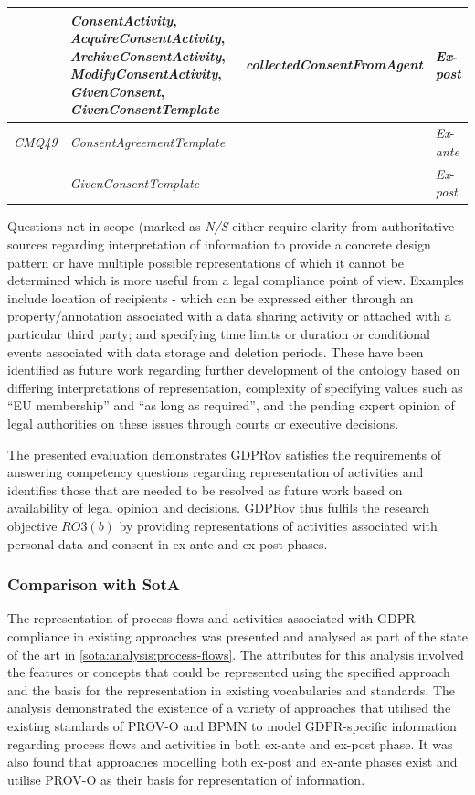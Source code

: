 \begin{table}[htbp]
\begin{tabularx}{\linewidth}{|l|X|p{5cm}|l|}
 & \textit{ConsentActivity}, \textit{AcquireConsentActivity}, \textit{ArchiveConsentActivity}, \textit{ModifyConsentActivity}, \textit{GivenConsent}, \textit{GivenConsentTemplate} & \textit{collectedConsentFromAgent} & \textit{Ex}-\textit{post} \\ \hline
\textit{CMQ49} & \textit{ConsentAgreementTemplate} &  & \textit{Ex}-\textit{ante} \\ \hline
 & \textit{GivenConsentTemplate} &  & \textit{Ex}-\textit{post} \\ \hline
\end{tabularx}
\end{table}

Questions not in scope (marked as \textit{N/S} either require clarity from authoritative sources regarding interpretation of information to provide a concrete design pattern or have multiple possible representations of which it cannot be determined which is more useful from a legal compliance point of view. Examples include location of recipients - which can be expressed either through an property/annotation associated with a data sharing activity or attached with a particular third party; and specifying time limits or duration or conditional events associated with data storage and deletion periods. These have been identified as future work regarding further development of the ontology based on differing interpretations of representation, complexity of specifying values such as ``EU membership'' and  ``as long as required'', and the pending expert opinion of legal authorities on these issues through courts or executive decisions.

The presented evaluation demonstrates GDPRov satisfies the requirements of answering competency questions regarding representation of activities and identifies those that are needed to be resolved as future work based on availability of legal opinion and decisions. GDPRov thus fulfils the research objective $RO3(b)$ by providing representations of activities associated with personal data and consent in ex-ante and ex-post phases.

\subsubsection{Comparison with SotA}
The representation of process flows and activities associated with GDPR compliance in existing approaches was presented and analysed as part of the state of the art in \autoref{sota:analysis:process-flows}.
The attributes for this analysis involved the features or concepts that could be represented using the specified approach and the basis for the representation in existing vocabularies and standards.
The analysis demonstrated the existence of a variety of approaches that utilised the existing standards of PROV-O and BPMN to model GDPR-specific information regarding process flows and activities in both ex-ante and ex-post phase. It was also found that approaches modelling both ex-post and ex-ante phases exist and utilise PROV-O as their basis for representation of information.

